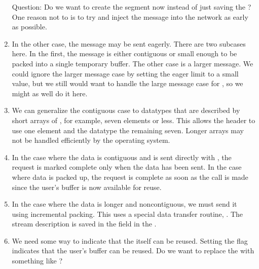 \begin{enumerate}
  Question: Do we want to create the segment now instead of just saving the 
  ?  One reason not to is to try and inject the 
  message into the network as early as possible.

\item In the other case, the message may be sent eagerly.  There are two
  subcases here.  In the first, the message is either contiguous or small
  enough to be packed into a single temporary buffer.  The other case is a
  larger message.  We could ignore the larger message case by setting the
  eager limit to a small value, but we still would want to handle the large
  message case for , so we might as well do it here.


\item We can generalize the contiguous case to datatypes that are described by
  short arrays of , for example, seven elements or less.
  This allows the header to use one element and the datatype the remaining
  seven.  Longer arrays may not be handled efficiently by the operating
  system. 

\item In the case where the data is contiguous and is sent directly with
  , the request is marked complete only when the data has
  been sent.  In the case where data is packed up, the request is complete as
  soon as the  call is made since the user's buffer is now
  available for reuse.  

\item In the case where the data is longer and noncontiguous, we must send it
  using incremental packing.  This uses a special data transfer routine,
  .  The stream description is saved in
  the  field in the .

\item We need some way to indicate that the  itself can be
  reused.  Setting the  flag indicates that the user's buffer
  can be reused.  Do we want to replace the  with something like
  ?
\end{enumerate}

